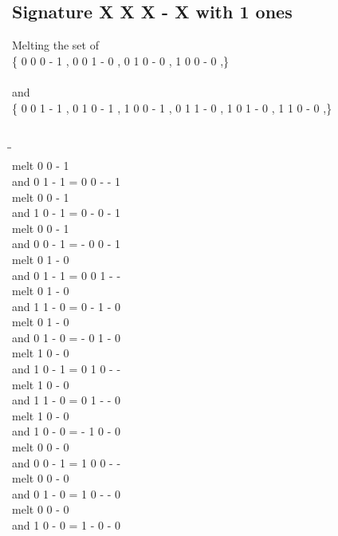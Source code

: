 \documentclass{article}
\begin{document}
\subsection{Signature X X X - X with 1 ones}
Melting the set of\\
\{ 0  0  0  -  1 , 0  0  1  -  0 , 0  1  0  -  0 , 1  0  0  -  0 ,\}\\\\
and\\
\{ 0  0  1  -  1 , 0  1  0  -  1 , 1  0  0  -  1 , 0  1  1  -  0 , 1  0  1  -  0 , 1  1  0  -  0 ,\}\\\\
\begin{tabbing}
\hspace{3cm}\=\hspace{3cm}\=\hspace{3cm}\\[1cm]
melt  0  0  -  1 \\
and  0  1  -  1 \>
 =  0  0  -  -  1 \\[1mm]
melt  0  0  -  1 \\
and  1  0  -  1 \>
 =  0  -  0  -  1 \\[1mm]
melt  0  0  -  1 \\
and  0  0  -  1 \>
 =  -  0  0  -  1 \\[1mm]
melt  0  1  -  0 \\
and  0  1  -  1 \>
 =  0  0  1  -  - \\[1mm]
melt  0  1  -  0 \\
and  1  1  -  0 \>
 =  0  -  1  -  0 \\[1mm]
melt  0  1  -  0 \\
and  0  1  -  0 \>
 =  -  0  1  -  0 \\[1mm]
melt  1  0  -  0 \\
and  1  0  -  1 \>
 =  0  1  0  -  - \\[1mm]
melt  1  0  -  0 \\
and  1  1  -  0 \>
 =  0  1  -  -  0 \\[1mm]
melt  1  0  -  0 \\
and  1  0  -  0 \>
 =  -  1  0  -  0 \\[1mm]
melt  0  0  -  0 \\
and  0  0  -  1 \>
 =  1  0  0  -  - \\[1mm]
melt  0  0  -  0 \\
and  0  1  -  0 \>
 =  1  0  -  -  0 \\[1mm]
melt  0  0  -  0 \\
and  1  0  -  0 \>
 =  1  -  0  -  0 \\[1mm]
\end{tabbing}
\newpage
\end{document}
